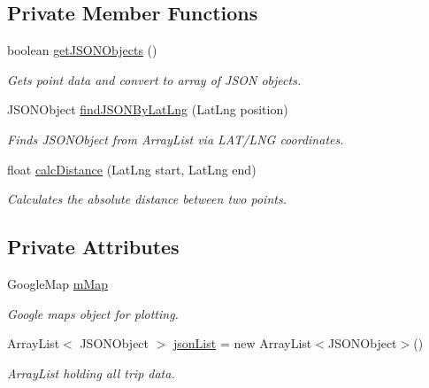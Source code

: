 \subsection*{Private Member Functions}
\begin{DoxyCompactItemize}
\item 
boolean \hyperlink{class_android_app_1_1_maps_activity_aaa859d423fe5040453c5af599e220699}{get\+J\+S\+O\+N\+Objects} ()
\begin{DoxyCompactList}\small\item\em Gets point data and convert to array of J\+S\+ON objects. \end{DoxyCompactList}\item 
J\+S\+O\+N\+Object \hyperlink{class_android_app_1_1_maps_activity_a18364d9334710362b1e6c39502353927}{find\+J\+S\+O\+N\+By\+Lat\+Lng} (Lat\+Lng position)
\begin{DoxyCompactList}\small\item\em Finds J\+S\+O\+N\+Object from Array\+List via L\+A\+T/\+L\+NG coordinates. \end{DoxyCompactList}\item 
float \hyperlink{class_android_app_1_1_maps_activity_aea9b9fe75f1d70e3c902c8348823efd0}{calc\+Distance} (Lat\+Lng start, Lat\+Lng end)
\begin{DoxyCompactList}\small\item\em Calculates the absolute distance between two points. \end{DoxyCompactList}\end{DoxyCompactItemize}
\subsection*{Private Attributes}
\begin{DoxyCompactItemize}
\item 
\mbox{\label{class_android_app_1_1_maps_activity_a373d4c770d2ab34538f9288d7c0e83ea}} 
Google\+Map \hyperlink{class_android_app_1_1_maps_activity_a373d4c770d2ab34538f9288d7c0e83ea}{m\+Map}
\begin{DoxyCompactList}\small\item\em Google maps object for plotting. \end{DoxyCompactList}\item 
\mbox{\label{class_android_app_1_1_maps_activity_a5ff2abfd342648b27a17551d5bd668ac}} 
Array\+List$<$ J\+S\+O\+N\+Object $>$ \hyperlink{class_android_app_1_1_maps_activity_a5ff2abfd342648b27a17551d5bd668ac}{json\+List} = new Array\+List$<$J\+S\+O\+N\+Object$>$()
\begin{DoxyCompactList}\small\item\em Array\+List holding all trip data. \end{DoxyCompactList}\end{DoxyCompactItemize}



